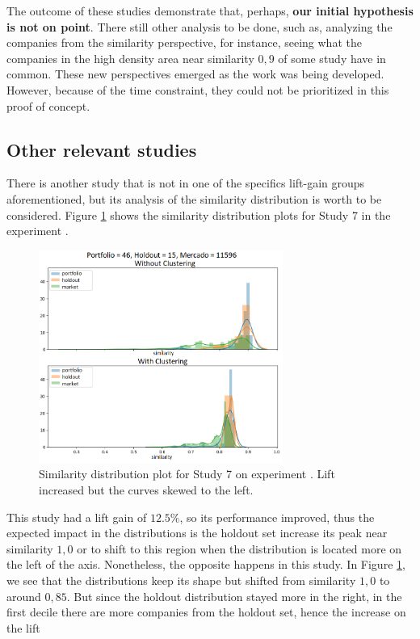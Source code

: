 The outcome of these studies demonstrate that, perhaps, \textbf{our initial hypothesis is not on point}. There still other analysis to be done, such as, analyzing the companies from the similarity perspective, for instance, seeing what the companies in the high density area near similarity $0,9$ of some study have in common. These new perspectives emerged as the work was being developed. However, because of the time constraint, they could not be prioritized in this proof of concept. 

\subsection{Other relevant studies}
\label{ch:worth-ment}

There is another study that is not in one of the specifics lift-gain groups aforementioned, but its analysis of the similarity distribution is worth to be considered. Figure \ref{fig:worth-mentioning-study-7} shows the similarity distribution plots for Study 7 in the experiment \nameExperimentII{}. 

\begin{figure}[!ht]
   \centering
   \includegraphics[width=8cm]{fig/ch4-worth-mentioning-study-7.png}
   \caption{Similarity distribution plot for Study 7 on experiment \nameExperimentII{}. Lift increased but the curves skewed to the left.}
   \label{fig:worth-mentioning-study-7}
\end{figure}

This study had a lift gain of $12.5\%$, so its performance improved, thus the expected impact in the distributions is the holdout set increase its peak near similarity $1,0$ or to shift to this region when the distribution is located more on the left of the axis. Nonetheless, the opposite happens in this study. In Figure \ref{fig:worth-mentioning-study-7}, we see that the distributions keep its shape but shifted from similarity $1,0$ to around $0,85$. But since the holdout distribution stayed more in the right, in the first decile there are more companies from the holdout set, hence the increase on the lift

